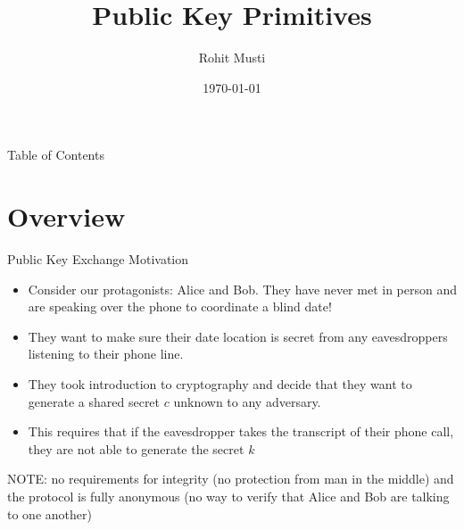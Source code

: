 \documentclass[handout]{beamer}
\title{Public Key Primitives}
\author{Rohit Musti}
\institute{CUNY - Hunter College}
\date{\today}
\begin{document}
 
\frame{\titlepage}

\begin{frame}{Table of Contents}
  \tableofcontents
\end{frame}


\section{Overview}

\begin{frame}{Public Key Exchange Motivation}
    \begin{itemize}
        \item \pause Consider our protagonists: Alice and Bob. They have never met in person and are speaking over the phone to coordinate a blind date!
        \item \pause They want to make sure their date location is secret from any eavesdroppers listening to their phone line.
        \item \pause They took introduction to cryptography and decide that they want to generate a shared secret \(c\) unknown to any adversary.
        \item \pause This requires that if the eavesdropper takes the transcript of their phone call, they are not able to generate the secret \(k\) 
    \end{itemize}
    \pause NOTE: no requirements for integrity (no protection from man in the middle) and the protocol is fully anonymous (no way to verify that Alice and Bob are talking to one another)
\end{frame}
\end{document}
